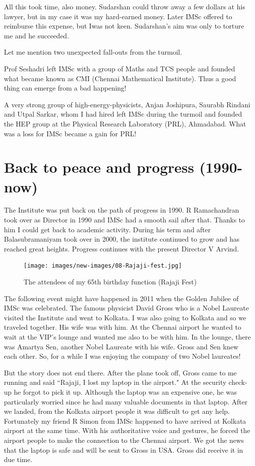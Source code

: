 All this took time, also money. Sudarshan could throw away a few dollars 
at his lawyer, but in my case it was my hard-earned money. Later IMSc 
offered to reimburse this expense, but I\break was not keen. Sudarshan's aim 
was only to torture me and he succeeded.

Let me mention two unexpected fall-outs from the turmoil.

Prof Seshadri left IMSc with a group of Maths and TCS people and founded 
what became known as CMI (Chennai Mathematical Institute). Thus a good 
thing can emerge from a bad happening!

A very strong group of high-energy-physicists, Anjan Joshipura, Saurabh 
Rindani and Utpal Sarkar, whom I had hired left IMSc during the turmoil 
and founded the HEP group at the Physical Research Laboratory 
(PRL), Ahmadabad. What was a loss for IMSc became a gain for PRL!

\vspace{-\topsep}
\section*{Back to peace and progress (1990-now)}

The Institute was put back on the path of progress in 1990. R 
Ramachandran took over as Director in 1990 and IMSc had a smooth sail 
after that. Thanks to him I could get back to academic activity. During 
his term and after Balasubramaniyam took over in 2000, the institute 
continued to grow and has reached great heights. Progress continues with 
the present Director V Arvind.
\smallskip

\begin{figure}[H]
\centering
\texttt{[image: images/new-images/08-Rajaji-fest.jpg]}
\caption{\small{The attendees of my 65th birthday function (Rajaji Fest)}}
\end{figure}

The following event might have happened in 2011 when the Golden Jubilee 
of IMSc was celebrated. The famous physicist David Gross who is a Nobel 
Laureate visited the Institute and went to Kolkata. I was also going to 
Kolkata and so we traveled together. His wife was with him. At the 
Chennai airport he wanted to wait at the VIP's lounge and wanted me also 
to be with him. In the lounge, there was Amartya Sen, another Nobel 
Laureate with his wife. Gross and Sen knew each other. So, for a while I 
was enjoying the company of two Nobel laureates!

But the story does not end there. After the plane took off, Gross came 
to me running and said ``Rajaji, I lost my laptop in the airport." At the 
security check-up he forgot to pick it up. Although the laptop was an 
expensive one, he was particularly worried since he had many valuable 
documents in that laptop. After we landed, from the Kolkata airport 
people it was difficult to get any help. Fortunately my friend R Simon 
from IMSc happened to have arrived at Kolkata airport at the same time. 
With his authoritative voice and gestures, he forced the airport people 
to make the connection to the Chennai airport. We got the news that the 
laptop is safe and will be sent to Gross in USA. Gross did receive it in 
due time.
\medskip

